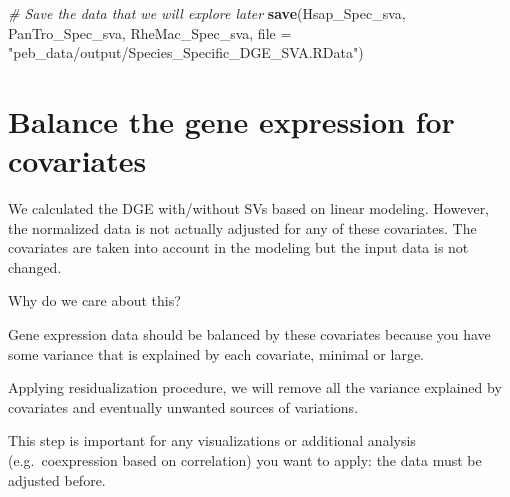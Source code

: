 \documentclass[]{book}
\newenvironment{Shaded}{\begin{snugshade}}{\end{snugshade}}
\newcommand{\CommentTok}[1]{\textcolor[rgb]{0.56,0.35,0.01}{\textit{#1}}}
\newcommand{\DataTypeTok}[1]{\textcolor[rgb]{0.13,0.29,0.53}{#1}}
\newcommand{\KeywordTok}[1]{\textcolor[rgb]{0.13,0.29,0.53}{\textbf{#1}}}
\newcommand{\NormalTok}[1]{#1}
\newcommand{\StringTok}[1]{\textcolor[rgb]{0.31,0.60,0.02}{#1}}
\begin{document}
\begin{Shaded}
\begin{Highlighting}[]

\CommentTok{# Save the data that we will explore later}
\KeywordTok{save}\NormalTok{(Hsap_Spec_sva, PanTro_Spec_sva, RheMac_Spec_sva, }\DataTypeTok{file =} \StringTok{"peb_data/output/Species_Specific_DGE_SVA.RData"}\NormalTok{)}
\end{Highlighting}
\end{Shaded}

\hypertarget{balance-the-gene-expression-for-covariates}{%
\section{Balance the gene expression for covariates}\label{balance-the-gene-expression-for-covariates}}

We calculated the DGE with/without SVs based on linear modeling.
However, the normalized data is not actually adjusted for any of these covariates. The covariates are taken into account in the modeling but the input data is not changed.

Why do we care about this?

Gene expression data should be balanced by these covariates because you have some variance that is explained by each covariate, minimal or large.

Applying residualization procedure, we will remove all the variance explained by covariates and eventually unwanted sources of variations.

This step is important for any visualizations or additional analysis (e.g.~coexpression based on correlation) you want to apply: the data must be adjusted before.
\end{document}
